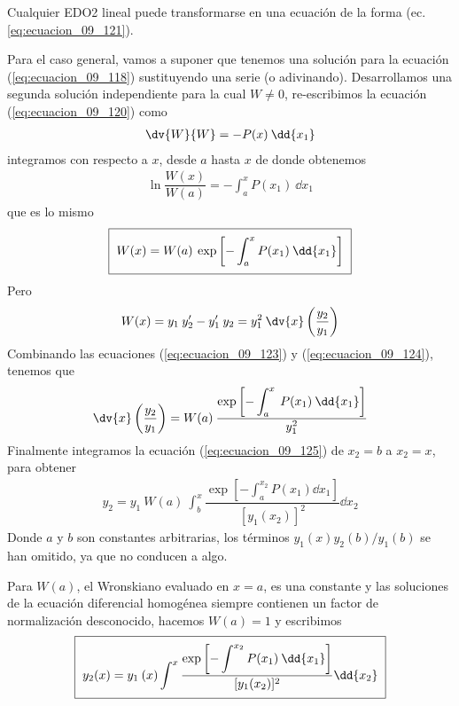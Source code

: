 Cualquier EDO2 lineal puede transformarse en una ecuación de la forma (ec. \ref{eq:ecuacion_09_121}).
\par
Para el caso general, vamos a suponer que tenemos una solución para la ecuación (\ref{eq:ecuacion_09_118}) sustituyendo una serie (o adivinando). Desarrollamos una segunda solución independiente para la cual $W \neq 0$, re-escribimos la ecuación (\ref{eq:ecuacion_09_120}) como
\begin{align*}
\dv{W}{W} = - P(x) \: \dd{x_{1}}
\end{align*}
integramos con respecto a $x$, desde $a$ hasta $x$ de donde obtenemos
\begin{align*}
\ln \dfrac{W(x)}{W(a)} = - \int_{a}^{x} P(x_{1}) \: \dd{x_{1}}
\end{align*}
que es lo mismo
\begin{align}
\setlength{\fboxsep}{2\fboxsep}\boxed{W(x) = W(a) \: \exp \left[ - \int_{a}^{x} P(x_{1}) \: \dd{x_{1}} \right]}
\label{eq:ecuacion_09_123}
\end{align}
Pero
\begin{align}
W(x) = y_{1} \: y^{\prime}_{2} - y^{\prime}_{1} \: y_{2} = y_{1}^{2} \: \dv{x} \left( \dfrac{y_{2}}{y_{1}} \right)
\label{eq:ecuacion_09_124}
\end{align}
Combinando las ecuaciones (\ref{eq:ecuacion_09_123}) y (\ref{eq:ecuacion_09_124}), tenemos que
\begin{align}
\dv{x} \left( \dfrac{y_{2}}{y_{1}} \right) =  W(a) \: \dfrac{\exp \left[\displaystyle - \int_{a}^{x} \: P(x_{1}) \: \dd{x_{1}} \right]}{y^{2}_{1}}
\label{eq:ecuacion_09_125}
\end{align}
Finalmente integramos la ecuación (\ref{eq:ecuacion_09_125}) de $x_{2} = b$ a $x_{2} = x$, para obtener
\begin{align}
y_{2} = y_{1} \: W(a) \: \int_{b}^{x} \dfrac{\exp \left[ \displaystyle - \int_{a}^{x_{2}} P(x_{1}) \dd{x_{1}} \right]}{[y_{1}(x_{2})]^{2}} \dd{x_{2}}
\label{eq:ecuacion_09_126}
\end{align}
Donde $a$ y $b$ son constantes arbitrarias, los términos $y_{1}(x)y_{2}(b)/y_{1}(b)$ se han omitido, ya que no conducen a algo.
\par
Para $W(a)$, el Wronskiano evaluado en $x=a$, es una constante y las soluciones de la ecuación diferencial homogénea siempre contienen un factor de normalización desconocido, hacemos $W(a)=1$ y escribimos
\begin{align}
\setlength{\fboxsep}{2\fboxsep}\boxed{y_{2}(x) =  y_{1} \: (x) \int^{x} \dfrac{\exp \left[ \displaystyle - \int^{x_{2}} P(x_{1}) \: \dd{x_{1}} \right]}{[y_{1}(x_{2})]^{2}} \dd{x_{2}}}
\label{eq:ecuacion_09_127}
\end{align}
